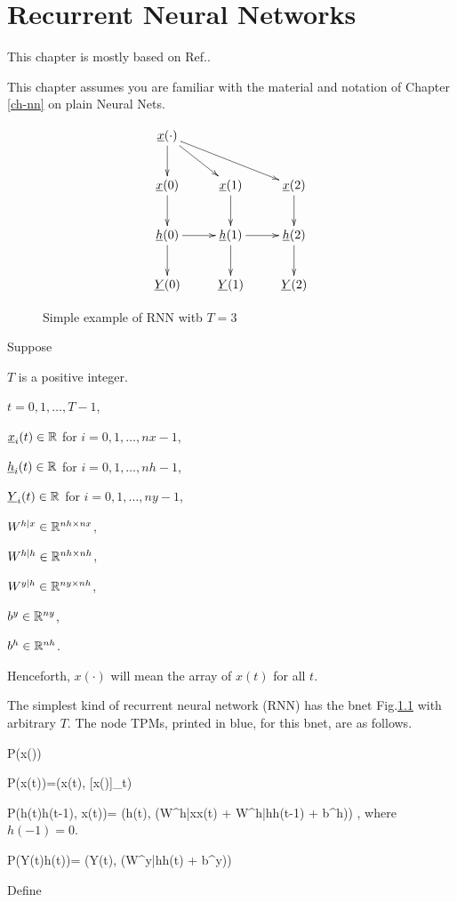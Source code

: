 \chapter{Recurrent Neural
 Networks}\label{ch-rnn}

This chapter is mostly
based on Ref.\cite{ng-rnn}.

This chapter
assumes you are
familiar 
with the material
and notation of Chapter \ref{ch-nn}
on plain Neural Nets.


\begin{figure}[h!]
\centering
$$\xymatrix{
\rvx(\cdot)\ar[d]\ar[dr]\ar[drr]\\
\rvx(0)\ar[d]&
\rvx(1)\ar[d]&
\rvx(2)\ar[d]\\
\rvh(0)\ar[d]\ar[r]&
\rvh(1)\ar[d]\ar[r]&
\rvh(2)\ar[d]\\
\rvY(0)&
\rvY(1)&
\rvY(2)
}$$
\caption{Simple example of 
RNN witb $T=3$}
\label{fig-rnn}
\end{figure}

Suppose

$T$ is a positive integer.

$t=0, 1, \ldots, T-1$,

${\underline{x}}_i(t)\in { \mathbb{R}}$ for
 $i=0,1, \ldots,nx-1$,

${\underline{h}}_i(t)\in { \mathbb{R}}$ for
 $i=0,1, \ldots,nh-1$,

${\underline{Y}}_i(t)\in { \mathbb{R}}$ for
 $i=0,1, \ldots,ny-1$,

$W^{h|x}\in{ \mathbb{R}}^{nh\times nx}$,

$W^{h|h}\in{ \mathbb{R}}^{nh\times nh}$,

$W^{y|h}\in{ \mathbb{R}}^{ny\times nh}$,

$b^y\in { \mathbb{R}}^{ny}$,

$b^h\in { \mathbb{R}}^{nh}$.

Henceforth, $x(\cdot)$ will
mean the array of $x(t)$ for all $t$.

The simplest kind of
recurrent neural network (RNN)
has
the bnet Fig.\ref{fig-rnn}
with arbitrary $T$.
The node
TPMs, printed in
blue, for this bnet, are as follows.

\beq\color{blue}
P(x(\cdot))
\eeq

\beq\color{blue}
P(x(t))=\delta(x(t), [x(\cdot)]_t)
\eeq

\beq\color{blue}
P(h(t)\cond h(t-1), x(t))=
\delta(h(t),
\cala(W^{h|x}x(t) +
 W^{h|h}h(t-1) + b^h))
\;,
\eeq
where
$h(-1)=0$.

\beq\color{blue}
P(Y(t)\cond h(t))=
\delta(Y(t),
\cala(W^{y|h}h(t) + b^y))
\eeq

Define


